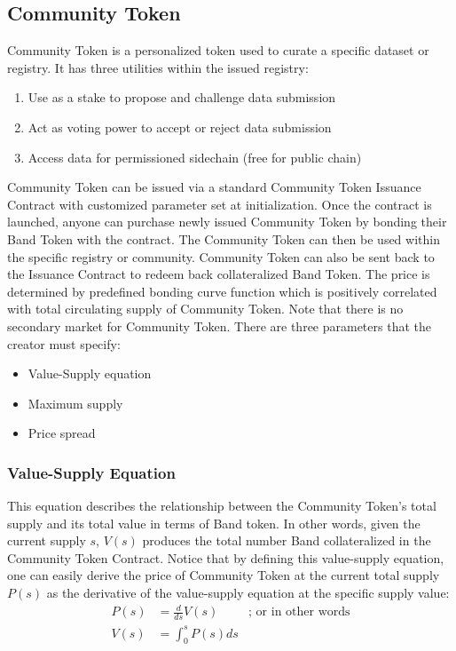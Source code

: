 \documentclass[letterpaper,11pt]{article}
\begin{document}
\subsection{Community Token} \label{sec:community-token}

Community Token is a personalized token used to curate a specific dataset or registry. It has three utilities within the issued registry:

\begin{enumerate}
\setlength\itemsep{0em}
\item Use as a stake to propose and challenge data submission
\item Act as voting power to accept or reject data submission
\item Access data for permissioned sidechain (free for public chain)
\end{enumerate}

Community Token can be issued via a standard Community Token Issuance Contract with customized parameter set at initialization. Once the contract is launched, anyone can purchase newly issued Community Token by bonding their Band Token with the contract. The Community Token can then be used within the specific registry or community. Community Token can also be sent back to the Issuance Contract to redeem back collateralized Band Token. The price is determined by predefined bonding curve function which is positively correlated with total circulating supply of Community Token. Note that there is no secondary market for Community Token. There are three parameters that the creator must specify: 

\begin{itemize}
\setlength\itemsep{0em}
\item Value-Supply equation
\item Maximum supply 
\item Price spread
\end{itemize}

\subsubsection{Value-Supply Equation} This equation describes the relationship between the Community Token's total supply and its total value in terms of Band token. In other words, given the current supply $s$, $V(s)$ produces the total number Band collateralized in the Community Token Contract. Notice that by defining this value-supply equation, one can easily derive the price of Community Token at the current total supply $P(s)$ as the derivative of the value-supply equation at the specific supply value:
\bigbreak
\begin{align*}
P(s) &= \frac{d}{ds}V(s) & \text{; or in other words} \\
V(s) &= \int_{0}^{s} P(s) ds
\end{align*}
\end{document}
